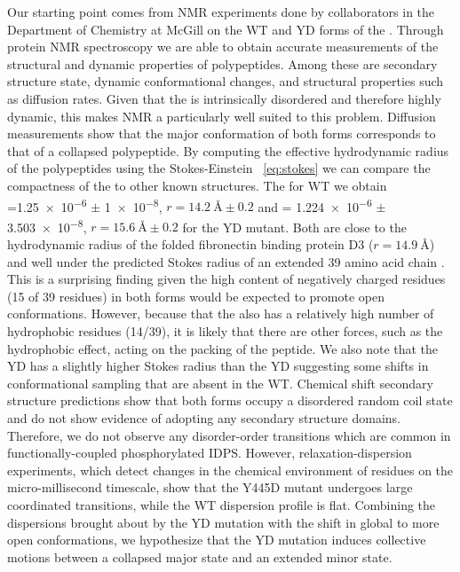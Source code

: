 Our starting point comes from NMR experiments done by collaborators in the Department of Chemistry at McGill on the WT and YD forms of the \gct. Through protein NMR spectroscopy we are able to obtain accurate \vitro measurements of the structural and dynamic properties of polypeptides. Among these are secondary structure state, dynamic conformational changes, and structural properties such as diffusion rates. Given that the \gct is intrinsically disordered and therefore highly dynamic, this makes NMR a particularly well suited to this problem. Diffusion measurements show that the major conformation of both forms corresponds to that of a collapsed polypeptide. By computing the effective hydrodynamic radius of the polypeptides using the Stokes-Einstein ~\ref{eq:stokes} we can compare the compactness of the \gct to other known structures. The for WT we obtain \diffusion=\num{1.25e-6} $\pm$  \SI{1e-8}{\dcunits}, $r = \SI{14.2}{\angstrom} \pm 0.2$ and \diffusion= \num{1.224e-6} $\pm$ \SI{3.503e-8}{\dcunits}, $r = \SI{15.6}{\angstrom} \pm 0.2$ for the YD mutant. Both are close to the hydrodynamic radius of the folded fibronectin binding protein D3 ($r = \SI{14.9}{\angstrom}$) ~\cite{wilkins1999hydrodynamic} and well under the predicted Stokes radius of an extended 39 amino acid chain . This is a surprising finding given the high content of negatively charged residues (15 of 39 residues) in both forms would be expected to promote open conformations. However, because that the \gct also has a relatively high number of hydrophobic residues (14/39), it is likely that there are other forces, such as the hydrophobic effect, acting on the packing of the peptide. We also note that the YD has a slightly higher Stokes radius than the YD suggesting some shifts in conformational sampling that are absent in the WT. Chemical shift secondary structure predictions show that both forms occupy a disordered random coil state and do not show evidence of adopting any secondary structure domains. Therefore, we do not observe any disorder-order transitions which are common in functionally-coupled phosphorylated IDPS. However, relaxation-dispersion experiments, which detect changes in the chemical environment of residues on the micro-millisecond timescale, show that the Y445D mutant undergoes large coordinated transitions, while the WT dispersion profile is flat. Combining the dispersions brought about by the YD mutation with the shift in global \diffusion to more open conformations, we hypothesize that the YD mutation induces collective motions between a collapsed major state and an extended minor state.

